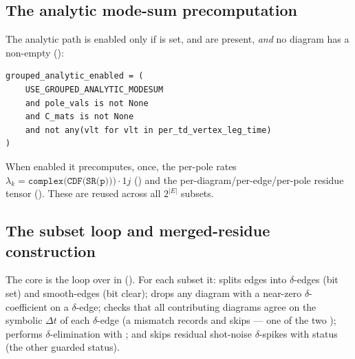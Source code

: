 \subsection{The analytic mode-sum precomputation}

The analytic path is enabled only if  is set,
 and  are present, \emph{and} no diagram has a
non-empty  ():
\begin{lstlisting}
grouped_analytic_enabled = (
    USE_GROUPED_ANALYTIC_MODESUM
    and pole_vals is not None
    and C_mats is not None
    and not any(vlt for vlt in per_td_vertex_leg_time)
)
\end{lstlisting}
When enabled it precomputes, once, the per-pole rates
$\lambda_k = \texttt{complex(CDF(SR(p)))}\cdot 1j$
() and the per-diagram/per-edge/per-pole residue
tensor  (). These
are reused across all $2^{|E|}$ subsets.

\subsection{The subset loop and merged-residue construction}

The core is the loop over  in 
(). For each subset it: splits edges into
$\delta$-edges (bit set) and smooth-edges (bit clear); drops any diagram with a
near-zero $\delta$-coefficient on a $\delta$-edge; checks that all contributing
diagrams agree on the symbolic $\Delta t$ of each $\delta$-edge (a mismatch
records  and skips --- one of the two
); performs $\delta$-elimination with
; and skips residual shot-noise $\delta$-spikes with status
 (the other guarded status).

